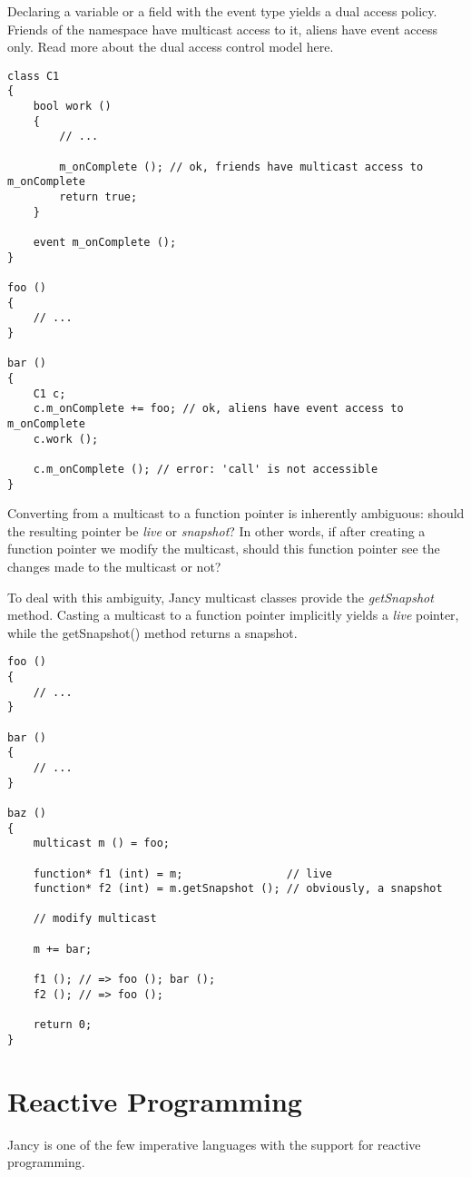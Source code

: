 \documentclass[oneside]{book}
\begin{document}
Declaring a variable or a field with the event type yields a dual access policy. Friends of the namespace have multicast access to it, aliens have event access only. Read more about the dual access control model here.

\begin{lstlisting}
class C1
{
    bool work ()
    {
        // ...

        m_onComplete (); // ok, friends have multicast access to m_onComplete
        return true;
    }

    event m_onComplete ();
}

foo ()
{
    // ...
}

bar ()
{
    C1 c;
    c.m_onComplete += foo; // ok, aliens have event access to m_onComplete
    c.work ();

    c.m_onComplete (); // error: 'call' is not accessible
}
\end{lstlisting}

Converting from a multicast to a function pointer is inherently ambiguous: should the resulting pointer be \emph{live} or \emph{snapshot}? In other words, if after creating a function pointer we modify the multicast, should this function pointer see the changes made to the multicast or not?

To deal with this ambiguity, Jancy multicast classes provide the \emph{getSnapshot} method. Casting a multicast to a function pointer implicitly yields a \emph{live} pointer, while the getSnapshot() method returns a snapshot.

\begin{lstlisting}
foo ()
{
    // ...
}

bar ()
{
    // ...
}

baz ()
{
    multicast m () = foo; 

    function* f1 (int) = m;                // live 
    function* f2 (int) = m.getSnapshot (); // obviously, a snapshot

    // modify multicast

    m += bar;

    f1 (); // => foo (); bar ();
    f2 (); // => foo ();

    return 0;
}
\end{lstlisting}

\section{Reactive Programming}

Jancy is one of the few imperative languages with the support for reactive programming.
\end{document}
